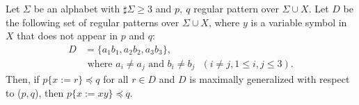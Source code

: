 \begin{lem}\label{lem:3consts_iii}
  Let $\Sigma$ be an alphabet with $\sharp\Sigma \ge 3$ and $p,~q$ regular pattern {\color{red}over} $\Sigma\cup X$.
  Let $D$ be the following set of regular patterns {\color{red}over} $\Sigma\cup X$, where $y$ is a variable symbol in $X$ that does not appear in $p$ and $q$:
  \begin{align*}
  D & = \{ a_{1}b_{1}, a_{2}b_{2}, a_{3}b_{3}\},\\
  & \mbox{ where } a_{i} \ne a_{j} \mbox{ and } b_{i} \ne b_{j} \mbox{ } (i\ne j, 1\le i,j\le 3).
  \end{align*}
  Then, if $p \{ x := r \} \preceq q$ for all $r \in D$ and $D$ is maximally generalized {\color{red}with respect to} ($p,q$), then $p \{ x := xy \} \preceq q$.
\end{lem}

